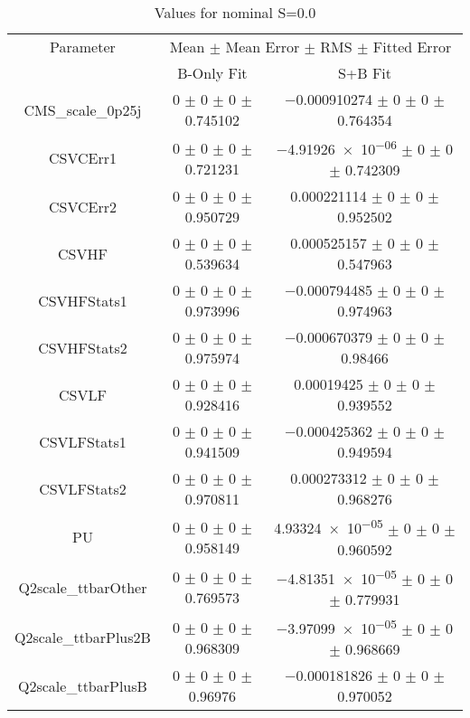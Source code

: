 \begin{table}
\centering
\caption{Values for nominal S=0.0}
\begin{tabular}{ccc}
\toprule
Parameter & \multicolumn{2}{c}{Mean $\pm$ Mean Error $\pm$ RMS $\pm$ Fitted Error}\\
 & B-Only Fit & S+B Fit\\
\midrule
CMS\_scale\_0p25j & \num{0} $\pm$ \num{0} $\pm$ \num{0} $\pm$ \num{0.745102} & \num{-0.000910274} $\pm$ \num{0} $\pm$ \num{0} $\pm$ \num{0.764354}\\
CSVCErr1 & \num{0} $\pm$ \num{0} $\pm$ \num{0} $\pm$ \num{0.721231} & \num{-4.91926e-06} $\pm$ \num{0} $\pm$ \num{0} $\pm$ \num{0.742309}\\
CSVCErr2 & \num{0} $\pm$ \num{0} $\pm$ \num{0} $\pm$ \num{0.950729} & \num{0.000221114} $\pm$ \num{0} $\pm$ \num{0} $\pm$ \num{0.952502}\\
CSVHF & \num{0} $\pm$ \num{0} $\pm$ \num{0} $\pm$ \num{0.539634} & \num{0.000525157} $\pm$ \num{0} $\pm$ \num{0} $\pm$ \num{0.547963}\\
CSVHFStats1 & \num{0} $\pm$ \num{0} $\pm$ \num{0} $\pm$ \num{0.973996} & \num{-0.000794485} $\pm$ \num{0} $\pm$ \num{0} $\pm$ \num{0.974963}\\
CSVHFStats2 & \num{0} $\pm$ \num{0} $\pm$ \num{0} $\pm$ \num{0.975974} & \num{-0.000670379} $\pm$ \num{0} $\pm$ \num{0} $\pm$ \num{0.98466}\\
CSVLF & \num{0} $\pm$ \num{0} $\pm$ \num{0} $\pm$ \num{0.928416} & \num{0.00019425} $\pm$ \num{0} $\pm$ \num{0} $\pm$ \num{0.939552}\\
CSVLFStats1 & \num{0} $\pm$ \num{0} $\pm$ \num{0} $\pm$ \num{0.941509} & \num{-0.000425362} $\pm$ \num{0} $\pm$ \num{0} $\pm$ \num{0.949594}\\
CSVLFStats2 & \num{0} $\pm$ \num{0} $\pm$ \num{0} $\pm$ \num{0.970811} & \num{0.000273312} $\pm$ \num{0} $\pm$ \num{0} $\pm$ \num{0.968276}\\
PU & \num{0} $\pm$ \num{0} $\pm$ \num{0} $\pm$ \num{0.958149} & \num{4.93324e-05} $\pm$ \num{0} $\pm$ \num{0} $\pm$ \num{0.960592}\\
Q2scale\_ttbarOther & \num{0} $\pm$ \num{0} $\pm$ \num{0} $\pm$ \num{0.769573} & \num{-4.81351e-05} $\pm$ \num{0} $\pm$ \num{0} $\pm$ \num{0.779931}\\
Q2scale\_ttbarPlus2B & \num{0} $\pm$ \num{0} $\pm$ \num{0} $\pm$ \num{0.968309} & \num{-3.97099e-05} $\pm$ \num{0} $\pm$ \num{0} $\pm$ \num{0.968669}\\
Q2scale\_ttbarPlusB & \num{0} $\pm$ \num{0} $\pm$ \num{0} $\pm$ \num{0.96976} & \num{-0.000181826} $\pm$ \num{0} $\pm$ \num{0} $\pm$ \num{0.970052}\\

\end{tabular}
\end{table}
